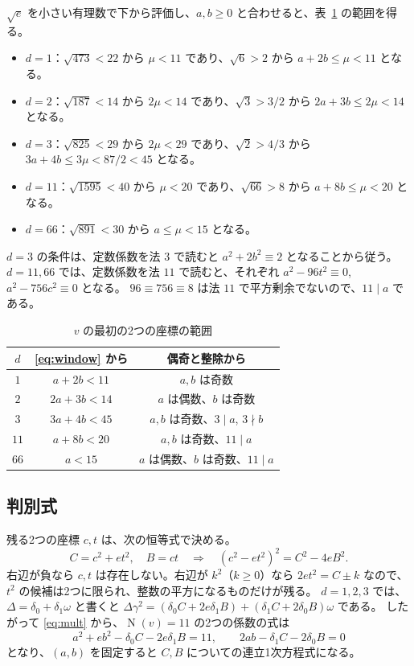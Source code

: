 \documentclass[a4paper,11pt]{ltjsarticle}
\theoremstyle{jplain}
\numberwithin{equation}{section}
\numberwithin{table}{section}
\newcommand{\Nm}{\operatorname{N}}
\begin{document}
$\sqrt e$ を小さい有理数で下から評価し、$a,b\ge0$ と合わせると、表~\ref{tab:ranges} の範囲を得る。
\begin{itemize}
\item $d=1$：$\sqrt{473}<22$ から $\mu<11$ であり、$\sqrt6>2$ から $a+2b\le\mu<11$ となる。
\item $d=2$：$\sqrt{187}<14$ から $2\mu<14$ であり、$\sqrt3>3/2$ から $2a+3b\le2\mu<14$ となる。
\item $d=3$：$\sqrt{825}<29$ から $2\mu<29$ であり、$\sqrt2>4/3$ から $3a+4b\le3\mu<87/2<45$ となる。
\item $d=11$：$\sqrt{1595}<40$ から $\mu<20$ であり、$\sqrt{66}>8$ から $a+8b\le\mu<20$ となる。
\item $d=66$：$\sqrt{891}<30$ から $a\le\mu<15$ となる。
\end{itemize}
$d=3$ の条件は、定数係数を法 $3$ で読むと $a^2+2b^2\equiv2$ となることから従う。
$d=11,66$ では、定数係数を法 $11$ で読むと、それぞれ $a^2-96t^2\equiv0$, $a^2-756c^2\equiv0$ となる。
$96\equiv756\equiv8$ は法 $11$ で平方剰余でないので、$11\mid a$ である。

\begin{table}[htbp]
\centering
\caption{$v$ の最初の2つの座標の範囲}\label{tab:ranges}
\begin{tabular}{ccc}
\toprule
$d$ & \eqref{eq:window} から & 偶奇と整除から\\
\midrule
$1$ & $a+2b<11$ & $a,b$ は奇数\\
$2$ & $2a+3b<14$ & $a$ は偶数、$b$ は奇数\\
$3$ & $3a+4b<45$ & $a,b$ は奇数、$3\mid a$, $3\nmid b$\\
$11$ & $a+8b<20$ & $a,b$ は奇数、$11\mid a$\\
$66$ & $a<15$ & $a$ は偶数、$b$ は奇数、$11\mid a$\\
\bottomrule
\end{tabular}
\end{table}

\subsection{判別式}

残る2つの座標 $c,t$ は、次の恒等式で決める。
\begin{equation}\label{eq:disc}
C=c^2+et^2,\quad B=ct\quad\Longrightarrow\quad(c^2-et^2)^2=C^2-4eB^2.
\end{equation}
右辺が負なら $c,t$ は存在しない。右辺が $k^2$（$k\ge0$）なら $2et^2=C\pm k$ なので、$t^2$ の候補は2つに限られ、整数の平方になるものだけが残る。
$d=1,2,3$ では、$\Delta=\delta_0+\delta_1\omega$ と書くと $\Delta\gamma^2=(\delta_0C+2e\delta_1B)+(\delta_1C+2\delta_0B)\omega$ である。
したがって \eqref{eq:mult} から、$\Nm(v)=11$ の2つの係数の式は
\[
a^2+eb^2-\delta_0C-2e\delta_1B=11,\qquad2ab-\delta_1C-2\delta_0B=0
\]
となり、$(a,b)$ を固定すると $C,B$ についての連立1次方程式になる。
\end{document}
